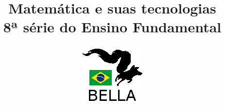 \documentclass{book}
\begin{document}
\title{Matemática e suas tecnologias \\
8ª série do Ensino Fundamental}
\author{\includegraphics{../../logos/128x128-brazil.png}}

\maketitle

\tableofcontents







\end{document}
